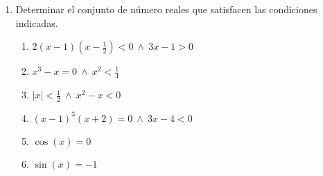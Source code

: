 \documentclass[a4paper]{article}
\newcommand{\exercise}{\item}
\newcommand{\Then}{\Rightarrow}
\newcommand{\Eq}{\Leftrightarrow}
\newcommand{\intersec}{\cap}
\newcommand{\union}{\cup}
\newcommand{\symdiff}{\Delta}
\newcommand{\df}[2]{\displaystyle\frac{#1}{#2}}
\newcommand{\power}[1]{\mathcal{P}\left(#1\right)}
\begin{document}
\begin{enumerate}
\begin{multicols}{2}
\begin{enumerate} [label=(\alph*)]
		\item $(A \subseteq C) \land (B \subseteq C) \Eq (A \union B) \subseteq C$
		\item $(X \subseteq A) \lor (X \subseteq B \Then X \subseteq (A \union B))$
		\item $\power{A \intersec B} = \power{A} \intersec \power{B}$
		\item $\power{A} \union \power{B} \subseteq \power{A\union B}$
		\item $(A\union B) \times C = (A \times C) \union (B \times C)$
		\item $(A\setminus B) \times C = (A \times C) \setminus (B \times C)$
		\item $(A\symdiff B) \times C = (A \times C) \symdiff (B \times C)$
	\end{enumerate}
	\end{multicols}
	\exercise Determinar el conjunto de número reales que satisfacen las condiciones indicadas.
	\begin{multicols}{2}
	\begin{enumerate} [label=(\alph*)]
		\item $2(x-1)\left(x-\df{1}{2}\right)<0 ~ \land ~ 3x-1>0$
		\item $x^3-x=0 ~ \land ~ x^2<\df{1}{4}$
		\item $|x|<\df{1}{2} ~ \land ~ x^2-x<0$
		\item $(x-1)^3(x+2)=0 ~ \land ~ 3x-4<0$
		\item $\cos(x)=0$
		\item $\sin(x)=-1$
	\end{enumerate}
	\end{multicols}
\end{enumerate}
\vspace{20pt} 
\end{document}
